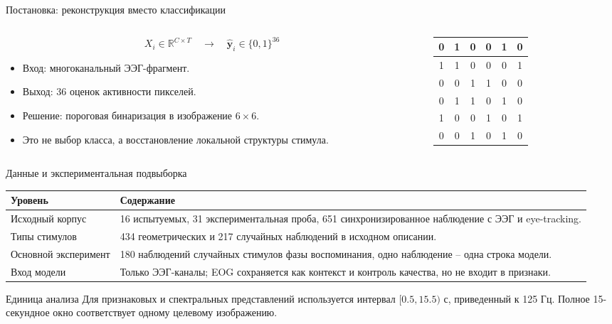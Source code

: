 \documentclass[aspectratio=169,10pt]{beamer}
\begin{document}
\begin{frame}{Постановка: реконструкция вместо классификации}
  \begin{columns}[T,totalwidth=\textwidth]
    \begin{column}{0.52\textwidth}
      \[
        X_i \in \mathbb{R}^{C \times T}
        \quad \rightarrow \quad
        \hat{\mathbf y}_i \in \{0,1\}^{36}
      \]
      \begin{itemize}
        \item Вход: многоканальный ЭЭГ-фрагмент.
        \item Выход: 36 оценок активности пикселей.
        \item Решение: пороговая бинаризация в изображение $6\times6$.
        \item Это не выбор класса, а восстановление локальной структуры стимула.
      \end{itemize}
    \end{column}
    \begin{column}{0.40\textwidth}
      \centering
      \setlength{\tabcolsep}{4pt}
      \renewcommand{\arraystretch}{1.25}
      \begin{tabular}{|c|c|c|c|c|c|}
        \hline
        0 & 1 & 0 & 0 & 1 & 0 \\ \hline
        1 & 1 & 0 & 0 & 0 & 1 \\ \hline
        0 & 0 & 1 & 1 & 0 & 0 \\ \hline
        0 & 1 & 1 & 0 & 1 & 0 \\ \hline
        1 & 0 & 0 & 1 & 0 & 1 \\ \hline
        0 & 0 & 1 & 0 & 1 & 0 \\ \hline
      \end{tabular}
    \end{column}
  \end{columns}
\end{frame}

\begin{frame}{Данные и экспериментальная подвыборка}
  \begin{tabularx}{\textwidth}{@{}lY@{}}
    \toprule
    Уровень & Содержание \\
    \midrule
    Исходный корпус & 16 испытуемых, 31 экспериментальная проба, 651 синхронизированное наблюдение с ЭЭГ и eye-tracking. \\
    Типы стимулов & 434 геометрических и 217 случайных наблюдений в исходном описании. \\
    Основной эксперимент & 180 наблюдений случайных стимулов фазы воспоминания, одно наблюдение -- одна строка модели. \\
    Вход модели & Только ЭЭГ-каналы; EOG сохраняется как контекст и контроль качества, но не входит в признаки. \\
    \bottomrule
  \end{tabularx}
  \vspace{0.8em}
  \begin{block}{Единица анализа}
    Для признаковых и спектральных представлений используется интервал $[0.5, 15.5)$ с, приведенный к 125 Гц. Полное 15-секундное окно соответствует одному целевому изображению.
  \end{block}
\end{frame}
\end{document}
